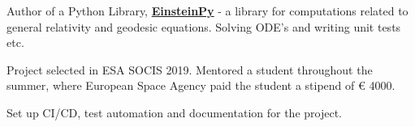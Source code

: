\documentclass[a4paper]{deedy-resume-openfont}
\begin{document}
\begin{minipage}[t]{0.66\textwidth}



\begin{tightemize}
\item Author of a Python Library, \textbf{\href{http://github.com/einsteinpy/einsteinpy}{EinsteinPy}} - a library for computations related to general relativity and geodesic equations. Solving ODE's and writing unit tests etc.
\item Project selected in ESA SOCIS 2019. Mentored a student throughout the summer, where European Space Agency paid the student a stipend of € 4000. 
\item Set up CI/CD, test automation and documentation for the project.
\end{tightemize}











\end{minipage}
\end{document}
